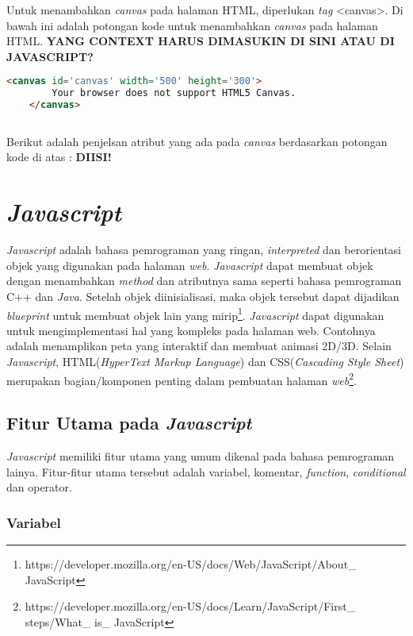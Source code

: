 Untuk menambahkan \textit{canvas} pada halaman HTML, diperlukan \textit{tag} <canvas>. Di bawah ini adalah potongan kode untuk menambahkan \textit{canvas} pada halaman HTML. \textbf{YANG CONTEXT HARUS DIMASUKIN DI SINI ATAU DI JAVASCRIPT?}

\begin{lstlisting}[language=HTML]
	<canvas id='canvas' width='500' height='300'>
		Your browser does not support HTML5 Canvas.
	</canvas>
	
\end{lstlisting}

Berikut adalah penjelsan atribut yang ada pada \textit{canvas} berdasarkan potongan kode di atas : \textbf{DIISI!}


\section{\textit{\textit{Javascript}}}
\label{sec:Javascript}
\textit{Javascript} adalah bahasa pemrograman yang ringan, \textit{interpreted} dan berorientasi objek yang digunakan pada halaman \textit{web}. \textit{Javascript} dapat membuat objek dengan menambahkan \textit{method} dan atributnya sama seperti bahasa pemrograman C++ dan \textit{Java}. Setelah objek diinisialisasi, maka objek tersebut dapat dijadikan \textit{blueprint} untuk membuat objek lain yang mirip\footnote{https://developer.mozilla.org/en-US/docs/Web/JavaScript/About\_ JavaScript}. \textit{Javascript} dapat digunakan untuk mengimplementasi hal yang kompleks pada halaman web. Contohnya adalah menamplikan peta yang interaktif dan membuat animasi 2D/3D. Selain \textit{Javascript}, HTML(\textit{HyperText Markup Language}) dan CSS(\textit{Cascading Style Sheet}) merupakan bagian/komponen penting dalam pembuatan halaman \textit{web}\footnote{https://developer.mozilla.org/en-US/docs/Learn/JavaScript/First\_ steps/What\_ is\_ JavaScript}.\\

\subsection{Fitur Utama pada \textit{Javascript}}
\textit{Javascript} memiliki fitur utama yang umum dikenal pada bahasa pemrograman lainya. Fitur-fitur utama tersebut adalah variabel, komentar, \textit{function}, \textit{conditional} dan operator. 

\subsubsection{Variabel}


